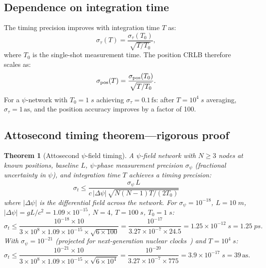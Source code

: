 \documentclass[aps,prd,twocolumn,superscriptaddress,nofootinbib,longbibliography]{revtex4-2}
\newcommand{\fs}{\,\mathrm{fs}}
\newcommand{\as}{\,\mathrm{as}}
\newtheorem{theorem}{Theorem}
\begin{document}
\subsection{Dependence on integration time}\label{sec:integration-time}

The timing precision improves with integration time $T$ as:
\begin{equation}\label{eq:sigma-tau-T}
\sigma_\tau(T) = \frac{\sigma_\tau(T_0)}{\sqrt{T/T_0}},
\end{equation}
where $T_0$ is the single-shot measurement time. The position CRLB
therefore scales as:
\begin{equation}\label{eq:sigma-pos-T}
\sigma_{\rm pos}(T) = \frac{\sigma_{\rm pos}(T_0)}{\sqrt{T/T_0}}.
\end{equation}
For a $\psi$-network with $T_0 = 1\;\si{s}$ achieving $\sigma_\tau = 0.1\fs$:
after $T = 10^4\;\si{s}$ averaging, $\sigma_\tau = 1\as$, and the
position accuracy improves by a factor of 100.

\subsection{Attosecond timing theorem---rigorous proof}\label{sec:atto-theorem}

\begin{theorem}[Attosecond $\psi$-field timing]\label{thm:attosecond}
A $\psi$-field network with $N \geq 3$ nodes at known positions,
baseline $L$, $\psi$-phase measurement precision $\sigma_\psi$
(fractional uncertainty in $\psi$), and integration time $T$ achieves
a timing precision:
\begin{equation}\label{eq:atto-bound}
\boxed{
\sigma_t \leq \frac{\sigma_\psi\,L}{c\,|\Delta\psi|\,\sqrt{N(N-1)T/(2T_0)}}
}
\end{equation}
where $|\Delta\psi|$ is the differential field across the network.
For $\sigma_\psi = 10^{-18}$, $L = 10\;\si{m}$,
$|\Delta\psi| = g L/c^2 = 1.09\times10^{-15}$, $N = 4$, $T = 100\;\si{s}$,
$T_0 = 1\;\si{s}$:
\begin{equation}
\sigma_t \leq \frac{10^{-18}\times 10}{3\times10^8\times1.09\times10^{-15}\times\sqrt{6\times100}}
= \frac{10^{-17}}{3.27\times10^{-7}\times24.5}
= 1.25\times10^{-12}\;\si{s} = 1.25\;\si{ps}.
\end{equation}
With $\sigma_\psi = 10^{-21}$ (projected for next-generation nuclear
clocks~\cite{Peik2021}) and $T = 10^4\;\si{s}$:
\begin{equation}
\sigma_t \leq \frac{10^{-21}\times 10}{3\times10^8\times1.09\times10^{-15}\times\sqrt{6\times10^4}}
= \frac{10^{-20}}{3.27\times10^{-7}\times775}
= 3.9\times10^{-17}\;\si{s} = 39\as.
\end{equation}
\end{theorem}
\end{document}
